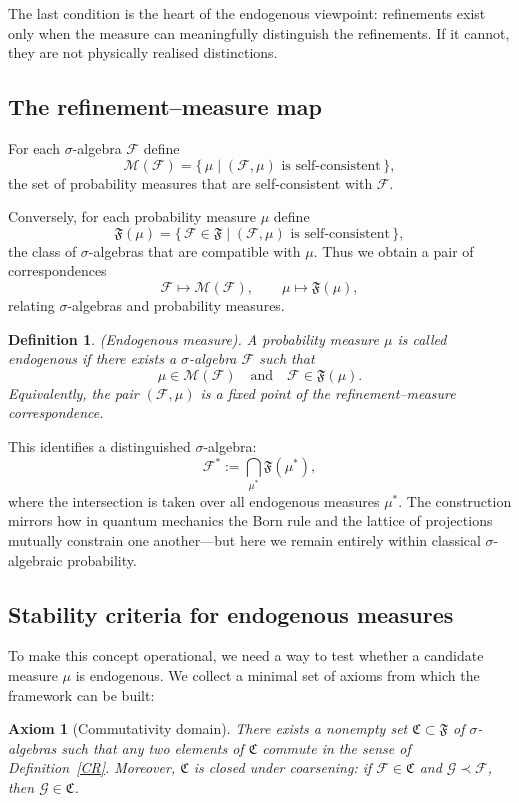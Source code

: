\documentclass[
 amsmath,amssymb,
  onecolumn %
]{revtex4-2}
\newtheorem{definition}[theorem]{Definition}
\newtheorem{axiom}{Axiom}
\begin{document}
The last condition is the heart of the endogenous viewpoint: refinements exist only when the measure can meaningfully distinguish the refinements. If it cannot, they are not physically realised distinctions.

\subsection{The refinement–measure map}
For each $\sigma$-algebra $\mathcal F$ define
\[
\mathcal M(\mathcal F)
= \{\,\mu \mid (\mathcal F,\mu)\text{ is self-consistent}\,\},
\]
the set of probability measures that are self-consistent with
$\mathcal F$.

Conversely, for each probability measure $\mu$ define
\[
\mathfrak F(\mu)
= \{\,\mathcal F\in\mathfrak F \mid (\mathcal F,\mu)\text{ is
self-consistent}\,\},
\]
the class of $\sigma$-algebras that are compatible with $\mu$. Thus we obtain a pair of correspondences
\[
\mathcal F \longmapsto \mathcal M(\mathcal F),
\qquad
\mu \longmapsto \mathfrak F(\mu),
\]
relating $\sigma$-algebras and probability measures.
\begin{definition}\label{def:endogenous}
(Endogenous measure).
A probability measure $\mu$ is called \emph{endogenous} if there exists
a $\sigma$-algebra $\mathcal F$ such that
\[
\mu\in\mathcal M(\mathcal F)
\quad\text{and}\quad
\mathcal F\in\mathfrak F(\mu).
\]
Equivalently, the pair $(\mathcal F,\mu)$ is a fixed point of the
refinement--measure correspondence.
\end{definition}
This identifies a distinguished $\sigma$-algebra:
$$
\mathcal{F}^{\ast} := \bigcap_{\mu^{\ast}} \mathfrak{F}(\mu^{\ast}),
$$
where the intersection is taken over all endogenous measures $ \mu^{\ast} $.
The construction mirrors how in quantum mechanics the Born rule and the lattice of projections mutually constrain one another—but here we remain entirely within classical $\sigma$-algebraic probability.

\subsection{Stability criteria for endogenous measures}
To make this concept operational, we need a way to test whether a candidate measure $\mu $ is endogenous.
We collect a minimal set of axioms from which the framework can be built:

\medskip

\begin{axiom}[Commutativity domain]\label{ax:A}
There exists a nonempty set $\mathfrak C \subset \mathfrak F$ of
$\sigma$-algebras such that any two elements of $\mathfrak C$ commute
in the sense of Definition~\ref{CR}. Moreover, $\mathfrak C$ is closed
under coarsening: if $\mathcal F\in\mathfrak C$ and
$\mathcal G\prec\mathcal F$, then $\mathcal G\in\mathfrak C$.
\end{axiom}
\end{document}
